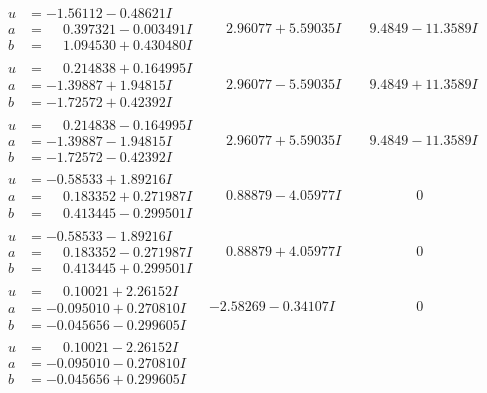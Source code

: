 \documentclass[1p]{elsarticle_modified}
\theoremstyle{definition}
\begin{document}
$$\begin{array}{c|c|c}
\begin{aligned}
u &= -1.56112 - 0.48621 I \\
a &= \phantom{-}0.397321 - 0.003491 I \\
b &= \phantom{-}1.094530 + 0.430480 I\end{aligned}
 & \phantom{-}2.96077 + 5.59035 I & \phantom{-}9.4849 - 11.3589 I \\ \hline\begin{aligned}
u &= \phantom{-}0.214838 + 0.164995 I \\
a &= -1.39887 + 1.94815 I \\
b &= -1.72572 + 0.42392 I\end{aligned}
 & \phantom{-}2.96077 - 5.59035 I & \phantom{-}9.4849 + 11.3589 I \\ \hline\begin{aligned}
u &= \phantom{-}0.214838 - 0.164995 I \\
a &= -1.39887 - 1.94815 I \\
b &= -1.72572 - 0.42392 I\end{aligned}
 & \phantom{-}2.96077 + 5.59035 I & \phantom{-}9.4849 - 11.3589 I \\ \hline\begin{aligned}
u &= -0.58533 + 1.89216 I \\
a &= \phantom{-}0.183352 + 0.271987 I \\
b &= \phantom{-}0.413445 - 0.299501 I\end{aligned}
 & \phantom{-}0.88879 - 4.05977 I & \phantom{-0.000000 } 0 \\ \hline\begin{aligned}
u &= -0.58533 - 1.89216 I \\
a &= \phantom{-}0.183352 - 0.271987 I \\
b &= \phantom{-}0.413445 + 0.299501 I\end{aligned}
 & \phantom{-}0.88879 + 4.05977 I & \phantom{-0.000000 } 0 \\ \hline\begin{aligned}
u &= \phantom{-}0.10021 + 2.26152 I \\
a &= -0.095010 + 0.270810 I \\
b &= -0.045656 - 0.299605 I\end{aligned}
 & -2.58269 - 0.34107 I & \phantom{-0.000000 } 0 \\ \hline\begin{aligned}
u &= \phantom{-}0.10021 - 2.26152 I \\
a &= -0.095010 - 0.270810 I \\
b &= -0.045656 + 0.299605 I\end{aligned}

\end{array}$$
\end{document}
